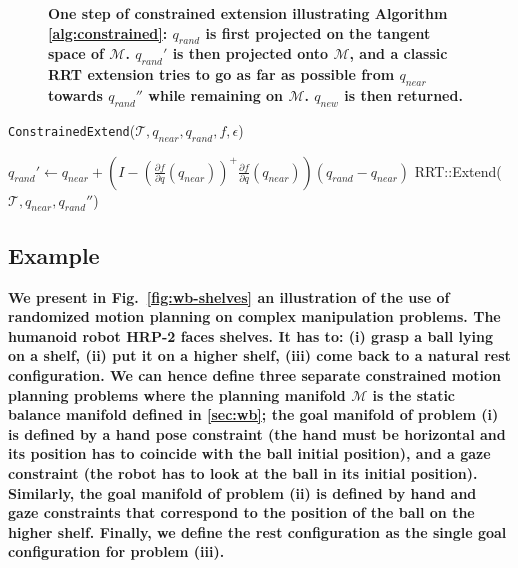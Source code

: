 \documentclass{article}
\newcommand\manifold{\mathcal{M}}
\begin{document}
\begin{figure}[h]
\begin{minipage}[c]{0.3\linewidth}


\end{minipage}

\caption{\textbf{One step of constrained extension illustrating
    Algorithm \ref{alg:constrained}: $q_{rand}$ is first projected on
    the tangent space of $\manifold$. $q_{rand}'$ is then projected
    onto $\manifold$, and a classic RRT extension tries to go as far
    as possible from $q_{near}$ towards $q_{rand}''$ while remaining
    on $\manifold$. $q_{new}$ is then returned.}}
\label{fig:gikrrt}
\end{figure}





\begin{algorithm}[h]
  \caption{\texttt{ConstrainedExtend}($\mathcal{T},q_{near},q_{rand},f,\epsilon$)}
  \label{alg:constrained}
  \begin{algorithmic}
    \STATE $q_{rand}' \leftarrow q_{near} +   
    \left(I -  
    \left(\frac{\partial f}{\partial q}(q_{near})\right)^{+}
    \frac{\partial f}{\partial q}(q_{near})\right) (q_{rand} - q_{near})$
    \STATE RRT::Extend($\mathcal{T},q_{near},q_{rand}''$)
    \ENDIF
  \end{algorithmic}
\end{algorithm}







\subsection{Example}

\textbf{We present in Fig.~\ref{fig:wb-shelves} an illustration of the
  use of randomized motion planning on complex manipulation
  problems. The humanoid robot HRP-2 faces shelves. It has to: (i)
  grasp a ball lying on a shelf, (ii) put it on a higher shelf, (iii)
  come back to a natural rest configuration. We can hence define three
  separate constrained motion planning problems where the planning
  manifold $\manifold$ is the static balance manifold defined in
  \ref{sec:wb}; the goal manifold of problem (i) is defined by a hand
  pose constraint (the hand must be horizontal and its position has to
  coincide with the ball initial position), and a gaze constraint (the
  robot has to look at the ball in its initial position). Similarly,
  the goal manifold of problem (ii) is defined by hand and gaze
  constraints that correspond to the position of the ball on the
  higher shelf. Finally, we define the rest configuration as the
  single goal configuration for problem (iii).}
\end{document}
